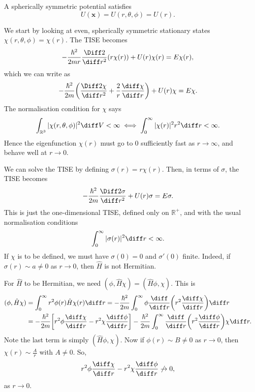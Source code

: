 \documentclass[12pt]{article}
\begin{document}
\begin{definition}
	A spherically symmetric potential satisfies
	\[
		U(\mathbf{x}) = U(r, \theta, \phi) = U(r)
	.\]
\end{definition}

We start by looking at even, spherically symmetric stationary states $\chi(r, \theta, \phi) = \chi(r)$. The TISE becomes
\[
	- \frac{\hbar^2}{2mr} \frac{\Diff2}{\diff r^2} (r\chi(r)) + U(r) \chi(r) = E \chi(r)
,\]
which we can write as
\[
	-\frac{\hbar^2}{2m} \biggl( \frac{\Diff2 \chi}{\diff r^2} + \frac{2}{r} \frac{\diff \chi}{\diff r} \biggr) + U(r) \chi = E \chi
.\]
The normalisation condition for $\chi$ says
\[
	\int_{\mathbb{R}^3}|\chi(r, \theta, \phi)|^2 \diff V < \infty \iff \int_{0}^{\infty} |\chi(r)|^2r^2 \diff r < \infty
.\]
Hence the eigenfunction $\chi(r)$ must go to $0$ sufficiently fast as $r \to \infty$, and behave well at $r \to 0$.

We can solve the TISE by defining $\sigma(r) = r \chi(r)$. Then, in terms of $\sigma$, the TISE becomes
\[
	- \frac{\hbar^2}{2m} \frac{\Diff2 \sigma}{\diff r^2} + U(r) \sigma = E \sigma
.\]
This is just the one-dimensional TISE, defined only on $\mathbb{R}^{+}$, and with the usual normalisation conditions
\[
	\int_{0}^{\infty}|\sigma(r)|^2\diff r < \infty
.\]
If $\chi$ is to be defined, we must have $\sigma(0) = 0$ and $\sigma'(0)$ finite. Indeed, if $\sigma(r) \sim a \neq 0$ as $r \to 0$, then $\hat H$ is not Hermitian.

\begin{proofbox}
	For $\hat H$ to be Hermitian, we need $(\phi, \hat H \chi) = (\hat H \phi, \chi)$. This is
	\begin{align*}
		(\phi, \hat H \chi) &= \int_{0}^{\infty} r^2 \phi(r) \hat H \chi(r) \diff r = - \frac{\hbar^2}{2m} \int_{0}^{\infty} \phi \frac{\diff}{\diff r} \biggl( r^2 \frac{\diff \chi}{\diff r} \biggr) \diff r \\
				    &= - \frac{\hbar^2}{2m} \biggl[ r^2 \phi \frac{\diff \chi}{\diff r} - r^2 \chi \frac{\diff \phi}{\diff r} \biggr] - \frac{\hbar^2}{2m} \int_{0}^{\infty} \frac{\diff}{\diff r} \biggl(r^2 \frac{\diff \phi}{\diff r} \biggr) \chi \diff r.
	\end{align*}
	Note the last term is simply $(\hat H \phi, \chi)$. Now if $\phi(r) \sim B \neq 0$ as $r \to 0$, then $\chi(r) \sim \frac{A}{r}$ with $A \neq 0$. So,
	\[
	r^2 \phi \frac{\diff \chi}{\diff r} - r^2 \chi \frac{\diff \phi}{\diff r} \not \to 0
	,\]
	as $r \to 0$.
\end{proofbox}
\end{document}
